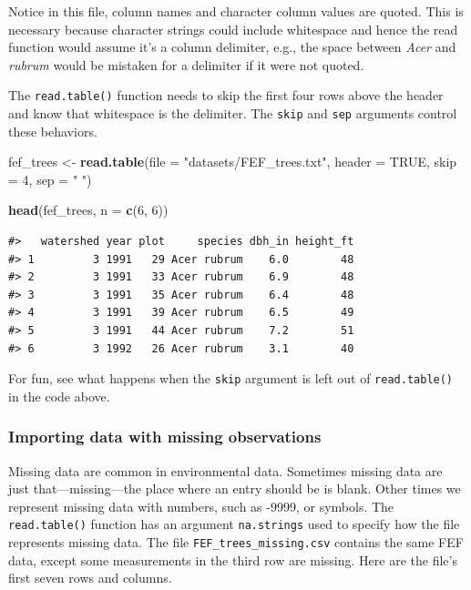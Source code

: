 \documentclass[
  11pt,
]{krantz}
\newenvironment{Shaded}{\begin{snugshade}}{\end{snugshade}}
\newcommand{\DataTypeTok}[1]{\textcolor[rgb]{0.13,0.29,0.53}{#1}}
\newcommand{\DecValTok}[1]{\textcolor[rgb]{0.00,0.00,0.81}{#1}}
\newcommand{\KeywordTok}[1]{\textcolor[rgb]{0.13,0.29,0.53}{\textbf{#1}}}
\newcommand{\NormalTok}[1]{#1}
\newcommand{\OtherTok}[1]{\textcolor[rgb]{0.56,0.35,0.01}{#1}}
\newcommand{\StringTok}[1]{\textcolor[rgb]{0.31,0.60,0.02}{#1}}
\theoremstyle{definition}
\theoremstyle{definition}
\theoremstyle{definition}
\theoremstyle{definition}
\theoremstyle{remark}
\begin{document}
Notice in this file, column names and character column values are quoted. This is necessary because character strings could include whitespace and hence the read function would assume it's a column delimiter, e.g., the space between \emph{Acer} and \emph{rubrum} would be mistaken for a delimiter if it were not quoted.

The \texttt{read.table()} function needs to skip the first four rows above the header and know that whitespace is the delimiter. The \texttt{skip} and \texttt{sep} arguments control these behaviors.

\begin{Shaded}
\begin{Highlighting}[]
\NormalTok{fef\_trees \textless{}{-}}\StringTok{ }\KeywordTok{read.table}\NormalTok{(}\DataTypeTok{file =} \StringTok{"datasets/FEF\_trees.txt"}\NormalTok{,}
                        \DataTypeTok{header =} \OtherTok{TRUE}\NormalTok{, }\DataTypeTok{skip =} \DecValTok{4}\NormalTok{, }\DataTypeTok{sep =} \StringTok{" "}\NormalTok{)}

\KeywordTok{head}\NormalTok{(fef\_trees, }\DataTypeTok{n =} \KeywordTok{c}\NormalTok{(}\DecValTok{6}\NormalTok{, }\DecValTok{6}\NormalTok{)) }
\end{Highlighting}
\end{Shaded}

\begin{verbatim}
#>   watershed year plot     species dbh_in height_ft
#> 1         3 1991   29 Acer rubrum    6.0        48
#> 2         3 1991   33 Acer rubrum    6.9        48
#> 3         3 1991   35 Acer rubrum    6.4        48
#> 4         3 1991   39 Acer rubrum    6.5        49
#> 5         3 1991   44 Acer rubrum    7.2        51
#> 6         3 1992   26 Acer rubrum    3.1        40
\end{verbatim}

For fun, see what happens when the \texttt{skip} argument is left out of \texttt{read.table()} in the code above.

\hypertarget{importing-data-with-missing-observations}{%
\subsubsection*{Importing data with missing observations}\label{importing-data-with-missing-observations}}


Missing data are common in environmental data. Sometimes missing data are just that---missing---the place where an entry should be is blank. Other times we represent missing data with numbers, such as -9999, or symbols. The \texttt{read.table()} function has an argument \texttt{na.strings} used to specify how the file represents missing data. The file \texttt{FEF\_trees\_missing.csv} contains the same FEF data, except some measurements in the third row are missing. Here are the file's first seven rows and columns.
\end{document}

